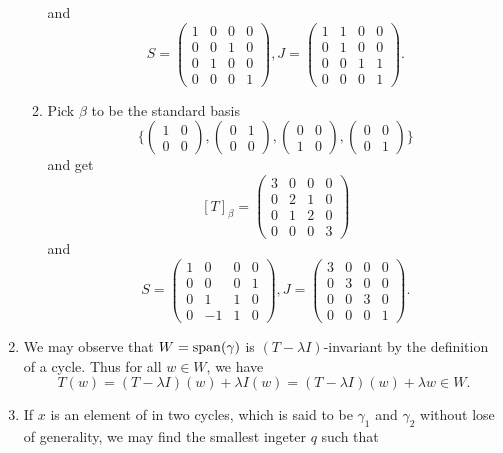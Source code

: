 \begin{enumerate}
\begin{enumerate}
and 
\[S=\begin{pmatrix}1&0&0&0\\0&0&1&0\\0&1&0&0\\0&0&0&1\end{pmatrix}, J=\begin{pmatrix}1&1&0&0\\0&1&0&0\\0&0&1&1\\0&0&0&1\end{pmatrix}.\]
\item Pick $\beta$ to be the standard basis 
\[\{\begin{pmatrix}1&0\\0&0\end{pmatrix},\begin{pmatrix}0&1\\0&0\end{pmatrix},\begin{pmatrix}0&0\\1&0\end{pmatrix},\begin{pmatrix}0&0\\0&1\end{pmatrix}\}\]
and get 
\[[T]_{\beta}=\begin{pmatrix}3&0&0&0\\0&2&1&0\\0&1&2&0\\0&0&0&3\end{pmatrix}\]
and 
\[S=\begin{pmatrix}1&0&0&0\\0&0&0&1\\0&1&1&0\\0&-1&1&0\end{pmatrix}, J=\begin{pmatrix}3&0&0&0\\0&3&0&0\\0&0&3&0\\0&0&0&1\end{pmatrix}.\]
\end{enumerate}
\item We may observe that $W=\sp(\gamma)$ is $(T-\lambda I)$-invariant by the definition of a cycle. Thus for all $w\in W$, we have 
\[T(w)=(T-\lambda I)(w)+\lambda I(w)=(T-\lambda I)(w)+\lambda w\in W.\]
\item If $x$ is an element of in two cycles, which is said to be $\gamma_1$ and $\gamma_2$ without lose of generality, we may find the smallest ingeter $q$ such that 

\end{enumerate}
